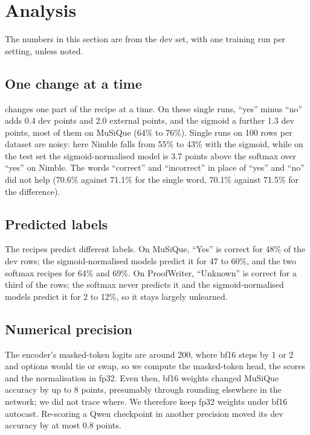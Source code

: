 \section{Analysis}
\label{sec:analysis}

The numbers in this section are from the dev set, with one training run per setting, unless noted.

\subsection{One change at a time}

 changes one part of the recipe at a time.
On these single runs, ``yes'' minus ``no'' adds 0.4 dev points and 2.0 external points, and the sigmoid a further 1.3 dev points, most of them on MuSiQue (64\% to 76\%).
Single runs on 100 rows per dataset are noisy: here Nimble falls from 55\% to 43\% with the sigmoid, while on the test set the sigmoid-normalised model is 3.7 points above the softmax over ``yes'' on Nimble.
The words ``correct'' and ``incorrect'' in place of ``yes'' and ``no'' did not help (70.6\% against 71.1\% for the single word, 70.1\% against 71.5\% for the difference).

\begin{table}[t]
  \centering\small
  \caption{Encoder variants on the dev rows, one training run each (accuracy, \%). The first row is the softmax with the ``yes'' logit,
  the setting used for the softmax results elsewhere. Bold: best in each column.}
  \label{tab:ablation}
  
\end{table}

\subsection{Predicted labels}
\label{sec:labels}

The recipes predict different labels.
On MuSiQue, ``Yes'' is correct for 48\% of the dev rows; the sigmoid-normalised models predict it for 47 to 60\%, and the two softmax recipes for 64\% and 69\%.
On ProofWriter, ``Unknown'' is correct for a third of the rows; the softmax never predicts it and the sigmoid-normalised models predict it for 2 to 12\%, so it stays largely unlearned.

\subsection{Numerical precision}
\label{sec:precision}

The encoder's masked-token logits are around 200, where bf16 steps by 1 or 2 and options would tie or swap, so we compute the masked-token head, the scores and the normalisation in fp32.
Even then, bf16 weights changed MuSiQue accuracy by up to 8 points, presumably through rounding elsewhere in the network; we did not trace where.
We therefore keep fp32 weights under bf16 autocast.
Re-scoring a Qwen checkpoint in another precision moved its dev accuracy by at most 0.8 points.
